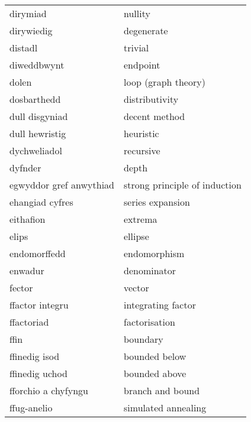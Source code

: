 \begin{supertabular}{p{0.22\textwidth}p{0.22\textwidth}}
                        dirymiad &                           nullity \\
                      dirywiedig &                        degenerate \\
                         distadl &                           trivial \\
                     diweddbwynt &                          endpoint \\
                           dolen &               loop (graph theory) \\
                     dosbarthedd &                    distributivity \\
                  dull disgyniad &                     decent method \\
                  dull hewristig &                         heuristic \\
                    dychweliadol &                         recursive \\
                         dyfnder &                             depth \\
         egwyddor gref anwythiad &     strong principle of induction \\
                 ehangiad cyfres &                  series expansion \\
                       eithafion &                           extrema \\
                           elips &                           ellipse \\
                    endomorffedd &                      endomorphism \\
                         enwadur &                       denominator \\
                          fector &                            vector \\
                 ffactor integru &                integrating factor \\
                      ffactoriad &                     factorisation \\
                            ffin &                          boundary \\
                   ffinedig isod &                     bounded below \\
                  ffinedig uchod &                     bounded above \\
             fforchio a chyfyngu &                  branch and bound \\
                     ffug-anelio &               simulated annealing \\

\end{supertabular}
